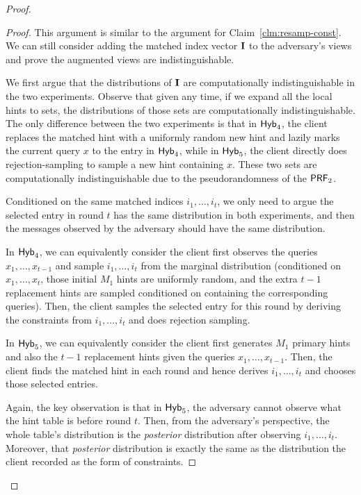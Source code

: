 \begin{proof}
    \begin{proof}
        This argument is similar to the argument for Claim~\ref{clm:resamp-const}. 
        We can still consider adding the matched index vector ${\bf I}$ to the adversary's views and prove the augmented views are indistinguishable.
        
        We first argue that the distributions of ${\bf I}$ are computationally indistinguishable in the two experiments.
        Observe that given any time, if we expand all the local hints to sets, the distributions of those sets are computationally indistinguishable. 
        The only difference between the two experiments is that in ${\sf Hyb}_4$, the client replaces the matched hint with a uniformly random new hint and lazily marks the current query $x$ to the entry in ${\sf Hyb}_4$, while in ${\sf Hyb}_5$, the client directly does rejection-sampling to sample a new hint containing $x$. 
        These two sets are computationally indistinguishable due to the pseudorandomness of the $\mathsf{PRF}_2$.
        
        Conditioned on the same matched indices $i_1,\dots,i_t$, we only need to argue the selected entry in round $t$ has the same distribution in both experiments, and then the messages observed by the adversary should have the same distribution.
        
        In ${\sf Hyb}_4$, we can equivalently consider the client first observes the queries $x_1,\dots,x_{t-1}$ and sample $i_1,\dots,i_t$ from the marginal distribution (conditioned on $x_1,\dots,x_t$, those initial $M_1$ hints are uniformly random, and the extra $t-1$ replacement hints are sampled conditioned on containing the corresponding queries).
        Then, the client samples the selected entry for this round by deriving the constraints from $i_1,\dots,i_t$ and does rejection sampling.
        
        In ${\sf Hyb}_5$, we can equivalently consider the client first generates $M_1$ primary hints and also the $t-1$ replacement hints given the queries $x_1,\dots,x_{t-1}$. 
        Then, the client finds the matched hint in each round and hence derives $i_1,\dots,i_t$ and chooses those selected entries.
        
        Again, the key observation is that in ${\sf Hyb}_5$, the adversary cannot observe what the hint table is before round $t$. 
        Then, from the adversary's perspective, the whole table's distribution is the \textit{posterior} distribution after observing $i_1,\dots,i_{t}$. 
        Moreover, that \textit{posterior} distribution is exactly the same as the distribution the client recorded as the form of constraints.
        

\end{proof}
\end{proof}
